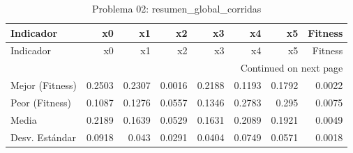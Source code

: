 \begin{longtable}{lrrrrrrr}
\caption{Problema 02: resumen\_global\_corridas}\label{tab:resumen_global_corridas} \\
\toprule
Indicador & x0 & x1 & x2 & x3 & x4 & x5 & Fitness \\
\midrule
\endfirsthead
\toprule
Indicador & x0 & x1 & x2 & x3 & x4 & x5 & Fitness \\
\midrule
\endhead
\midrule
\multicolumn{8}{r}{Continued on next page} \\
\midrule
\endfoot
\bottomrule
\endlastfoot
Mejor (Fitness) & 0.2503 & 0.2307 & 0.0016 & 0.2188 & 0.1193 & 0.1792 & 0.0022 \\
Peor (Fitness) & 0.1087 & 0.1276 & 0.0557 & 0.1346 & 0.2783 & 0.295 & 0.0075 \\
Media & 0.2189 & 0.1639 & 0.0529 & 0.1631 & 0.2089 & 0.1921 & 0.0049 \\
Desv. Estándar & 0.0918 & 0.043 & 0.0291 & 0.0404 & 0.0749 & 0.0571 & 0.0018 \\
\end{longtable}